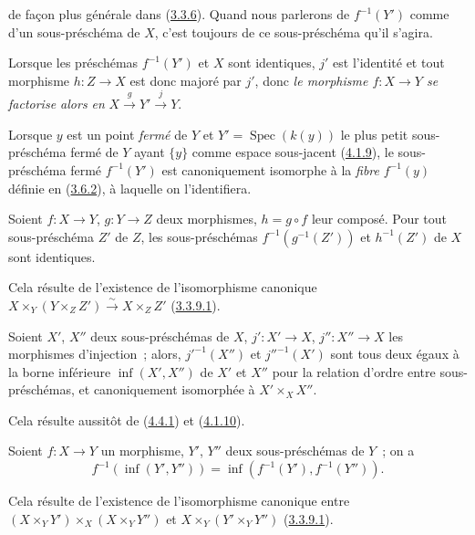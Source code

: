 de façon plus générale dans (\hyperref[I.3.3.6-fr]{3.3.6}). Quand nous
parlerons de $f^{-1}(Y')$ comme d'un sous-préschéma de $X$, c'est toujours de
ce sous-préschéma qu'il s'agira.

Lorsque les préschémas $f^{-1}(Y')$ et $X$ sont identiques, $j'$ est
l'identité et tout morphisme $h:Z\to X$ est donc majoré par $j'$, donc
\emph{le morphisme $f:X\to Y$ se factorise alors en}
$X\xrightarrow{g}Y'\xrightarrow{j}Y$.

Lorsque $y$ est un point \emph{fermé} de $Y$ et
$Y'=\operatorname{Spec}(k(y))$ le plus petit sous-préschéma fermé de $Y$ ayant
$\{y\}$ comme espace sous-jacent (\hyperref[I.4.1.9-fr]{4.1.9}), le
sous-préschéma fermé $f^{-1}(Y')$ est canoniquement isomorphe à la
\emph{fibre} $f^{-1}(y)$ définie en (\hyperref[I.3.6.2-fr]{3.6.2}), à
laquelle on l'identifiera.

\begin{corollary}[4.4.2]
\label{I.4.4.2-fr}
Soient $f:X\to Y$, $g:Y\to Z$ deux morphismes, $h=g\circ f$ leur composé.
Pour tout sous-préschéma $Z'$ de $Z$, les sous-préschémas
$f^{-1}(g^{-1}(Z'))$ et $h^{-1}(Z')$ de $X$ sont identiques.
\end{corollary}

Cela résulte de l'existence de l'isomorphisme canonique
$X\times_Y(Y\times_Z Z')\xrightarrow{\sim}X\times_Z Z'$
(\hyperref[I.3.3.9.1-fr]{3.3.9.1}).

\begin{corollary}[4.4.3]
\label{I.4.4.3-fr}
Soient $X'$, $X''$ deux sous-préschémas de $X$, $j':X'\to X$,
$j'':X''\to X$ les morphismes d'injection~; alors, ${j'}^{-1}(X'')$ et
${j''}^{-1}(X')$ sont tous deux égaux à la borne inférieure
$\inf(X',X'')$ de $X'$ et $X''$ pour la relation d'ordre entre
sous-préschémas, et canoniquement isomorphée à $X'\times_X X''$.
\end{corollary}

Cela résulte aussitôt de (\hyperref[I.4.4.1-fr]{4.4.1}) et
(\hyperref[I.4.1.10-fr]{4.1.10}).

\begin{corollary}[4.4.4]
\label{I.4.4.4-fr}
Soient $f:X\to Y$ un morphisme, $Y'$, $Y''$ deux sous-préschémas de $Y$~;
on a
\[
  f^{-1}(\inf(Y',Y''))=\inf(f^{-1}(Y'),f^{-1}(Y'')).
\]
\end{corollary}

Cela résulte de l'existence de l'isomorphisme canonique entre
$(X\times_Y Y')\times_X(X\times_Y Y'')$ et
$X\times_Y(Y'\times_Y Y'')$ (\hyperref[I.3.3.9.1-fr]{3.3.9.1}).

